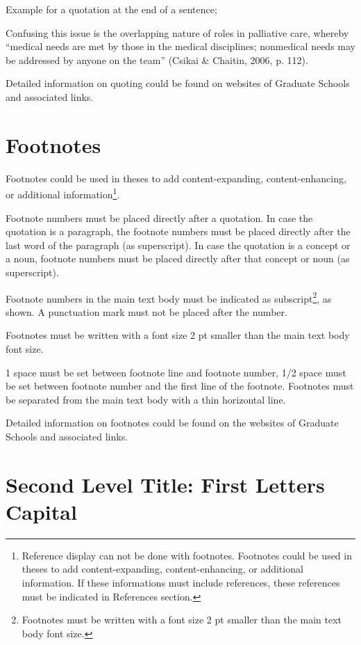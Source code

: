 Example for a quotation at the end of a sentence;

Confusing this issue is the overlapping nature of roles in palliative care, whereby “medical needs are met by those in the medical disciplines; nonmedical needs may be addressed by anyone on the team” (Csikai \& Chaitin, 2006, p. 112). 

Detailed information on quoting could be found on websites of Graduate Schools and associated links.

\section{Footnotes}

Footnotes could be used in theses to add content-expanding, content-enhancing, or additional information\footnote{Reference display can not be done with footnotes. Footnotes could be used in theses to add content-expanding, content-enhancing, or additional information. If these informations must include references, these references must be indicated in References section.}. 

Footnote numbers must be placed directly after a quotation. In case the quotation is a paragraph, the footnote numbers must be placed directly after the last word of the paragraph (as superscript). In case the quotation is a concept or a noun, footnote numbers must be placed directly after that concept or noun (as superscript). 

Footnote numbers in the main text body must be indicated as subscript\footnote{Footnotes must be written with a font size 2 pt smaller than the main text body font size.}, as shown. A punctuation mark must not be placed after the number.

Footnotes must be written with a font size 2 pt smaller than the main text body font size. 

1 space must be set between footnote line and footnote number, 1/2 space must be set between footnote number and the first line of the footnote. Footnotes must be separated from the main text body with a thin horizontal line. 

Detailed information on footnotes could be found on the websites of Graduate Schools and associated links.

\section{Second Level Title: First Letters Capital}

